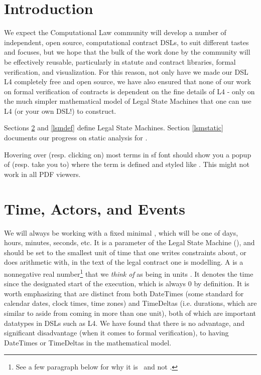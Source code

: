 \documentclass[12pt]{article}
\newcommand{\term}[1]{\EM{\textsf{\hyperref[#1]{#1}}}\xspace}
\newcommand{\termz}[2]{\EM{\textsf{\hyperref[#1]{#2}}}\xspace}
\newcommand{\lsm}{\texorpdfstring{\termz{lsm}{CSM}}{CSM}}
\newcommand{\lsms}{\texorpdfstring{\termz{lsm}{CSMs}}{CSMs}}
\newcommand{\timeunit}{\term{timeunit}}
\newcommand{\timestamps}{\termz{timestamp}{timestamps}}
\newcommand{\TS}{\EM{\mathbb{\hyperref[TS]{T}}}\xsapce}
\begin{document}
\section{Introduction}

We expect the Computational Law community will develop a number of independent, open source, computational contract DSLs, to suit different tastes and focuses, but we hope that the bulk of the work done by the community will be effectively reusable, particularly in statute and contract libraries, formal verification, and visualization. For this reason, not only have we made our DSL L4 completely free and open source, we have also ensured that none of our work on formal verification of contracts is dependent on the fine details of L4 - only on the much simpler mathematical model of Legal State Machines that one can use L4 (or your own DSL!) to construct.

Sections \ref{basics} and \ref{lsmdef} define Legal State Machines. Section \ref{lsmstatic} documents our progress on static analysis for \lsms.

Hovering over (resp. clicking on) most terms in \textsf{{sf font}} should show you a popup of (resp. take you to)  where the term is defined and styled like . This might not work in all PDF viewers.


\section{Time, Actors, and Events} \label{basics}
We will always be working with a fixed minimal , which will be one of days, hours, minutes, seconds, etc. It is a parameter of the Legal State Machine (\lsm), and should be set to the smallest unit of time that one writes constraints about, or does arithmetic with, in the text of the legal contract one is modelling.  A  is  a nonnegative real number\footnote{See a few paragraph below for why it is \RR\, and not \NN.} that we \textit{think of} as being in units \timeunit. It denotes the time since the designated start of the \lsm execution, which is always 0 by definition.
It is worth emphasizing that \timestamps are distinct from both DateTimes (some standard for calendar dates, clock times, time zones) and TimeDeltas (i.e. durations, which are similar to \timeunit aside from coming in more than one unit), both of which are important datatypes in DSLs such as L4. We have found that there is no advantage, and significant disadvantage (when it comes to formal verification), to having DateTimes or TimeDeltas in the mathematical model.
\end{document}
